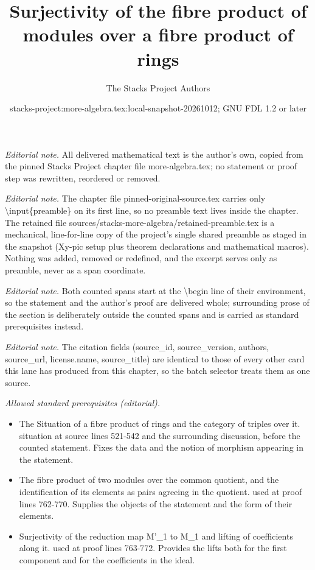 \documentclass[10pt,a4paper]{amsart}
\title{Surjectivity of the fibre product of modules over a fibre product of rings}
\author{The Stacks Project Authors}
\date{stacks-project:more-algebra.tex:local-snapshot-20261012; GNU FDL 1.2 or later}
\theoremstyle{plain}
\theoremstyle{definition}
\theoremstyle{remark}
\numberwithin{equation}{subsection}
\begin{document}
\maketitle
\setcounter{subsection}{1}
\noindent\textit{Editorial note.} All delivered mathematical text is the author's own, copied from the pinned Stacks Project chapter file more-algebra.tex; no statement or proof step was rewritten, reordered or removed.\par\medskip
\noindent\textit{Editorial note.} The chapter file pinned-original-source.tex carries only \textbackslash{}input\{preamble\} on its first line, so no preamble text lives inside the chapter. The retained file sources/stacks-more-algebra/retained-preamble.tex is a mechanical, line-for-line copy of the project's single shared preamble as staged in the snapshot (Xy-pic setup plus theorem declarations and mathematical macros). Nothing was added, removed or redefined, and the excerpt serves only as preamble, never as a span coordinate.\par\medskip
\noindent\textit{Editorial note.} Both counted spans start at the \textbackslash{}begin line of their environment, so the statement and the author's proof are delivered whole; surrounding prose of the section is deliberately outside the counted spans and is carried as standard prerequisites instead.\par\medskip
\noindent\textit{Editorial note.} The citation fields (source\_id, source\_version, authors, source\_url, license.name, source\_title) are identical to those of every other card this lane has produced from this chapter, so the batch selector treats them as one source.\par\medskip
\noindent\textit{Allowed standard prerequisites (editorial).}\begin{itemize}
\item The Situation of a fibre product of rings and the category of triples over it. situation at source lines 521-542 and the surrounding discussion, before the counted statement. Fixes the data and the notion of morphism appearing in the statement.
\item The fibre product of two modules over the common quotient, and the identification of its elements as pairs agreeing in the quotient. used at proof lines 762-770. Supplies the objects of the statement and the form of their elements.
\item Surjectivity of the reduction map M'\_1 to M\_1 and lifting of coefficients along it. used at proof lines 763-772. Provides the lifts both for the first component and for the coefficients in the ideal.
\end{itemize}\medskip
\end{document}

